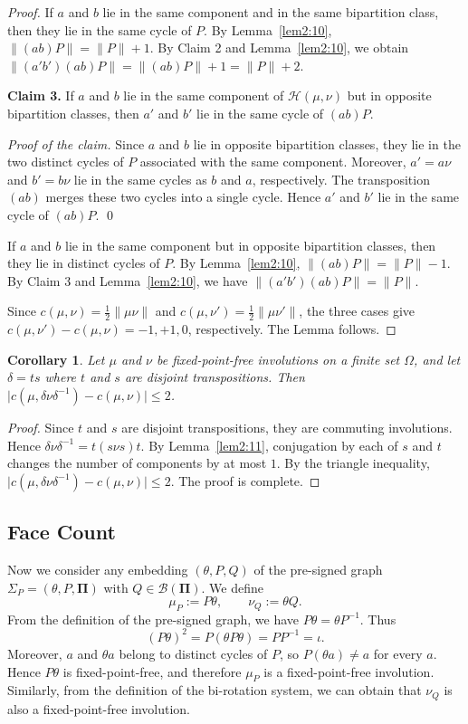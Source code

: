 \documentclass[10pt,a4paper]{amsart}
\newtheorem{corollary}[theorem]{Corollary}
\begin{document}
\begin{proof}
\medskip
If $a$ and $b$ lie in the same component and in the same bipartition class, then they lie in the same cycle of $P$. By Lemma~\ref{lem2:10},
$\lVert(ab)P\rVert=\lVert P\rVert+1$.
By Claim 2 and Lemma~\ref{lem2:10}, we obtain
$\lVert (a'b')(ab)P\rVert=\lVert(ab)P\rVert+1=\lVert P\rVert+2$.


\medskip
\noindent\textbf{Claim 3.}
If $a$ and $b$ lie in the same component of $\mathcal H(\mu,\nu)$ but in opposite bipartition classes, then $a'$ and $b'$ lie in the same cycle of $(ab)P$.

\smallskip
\noindent\emph{Proof of the claim.}
Since $a$ and $b$ lie in opposite bipartition classes, they lie in the two distinct cycles of $P$ associated with the same component. Moreover, $a'=a\nu$ and $b'=b\nu$ lie in the same cycles as
$b$ and $a$, respectively. The transposition $(ab)$ merges these two cycles into a single cycle. Hence $a'$ and $b'$ lie in the same cycle of $(ab)P$.  \qed

\medskip
If $a$ and $b$ lie in the same component but in opposite bipartition classes, then they lie in distinct cycles of $P$. By Lemma~\ref{lem2:10},
$\lVert(ab)P\rVert=\lVert P\rVert-1$.
By  Claim 3 and Lemma~\ref{lem2:10}, we have $\lVert (a'b')(ab)P\rVert=\lVert P\rVert$.


Since $c(\mu,\nu)=\frac12\lVert\mu\nu\rVert$ and
$c(\mu,\nu')=\frac12\lVert\mu\nu'\rVert$, the three cases give
$c(\mu,\nu')-c(\mu,\nu)=-1,+1,0$, respectively.  The Lemma follows.
\end{proof}


\begin{corollary}
\label{cor2:12}
Let $\mu$ and $\nu$ be fixed-point-free involutions on a finite set $\Omega$, and let $\delta=ts$ where $t$ and $s$ are disjoint transpositions. Then
$\bigl|c(\mu,\delta\nu\delta^{-1})-c(\mu,\nu)\bigr|\leq 2$.
\end{corollary}

\begin{proof}
Since $t$ and $s$ are disjoint transpositions, they are commuting involutions. Hence
$\delta\nu\delta^{-1}=t(s\nu s)t$.
By Lemma~\ref{lem2:11}, conjugation by each of $s$ and $t$ changes the number of components by at most $1$. By the triangle inequality,
$\bigl|c(\mu,\delta\nu\delta^{-1})-c(\mu,\nu)\bigr|\leq 2$. The proof is complete.
\end{proof}

\subsection{Face Count}
 Now we consider any embedding $(\theta,P,Q)$ of the pre-signed graph $\Sigma_P=(\theta,P,\mathbf{\Pi})$ with $Q\in\mathcal B(\mathbf{\Pi})$. We define
$$ \mu_P:=P\theta,
  \qquad
  \nu_Q:=\theta Q.$$
From the definition of the pre-signed graph, we have $P\theta=\theta P^{-1}$. Thus
\[
(P\theta)^2=P(\theta P\theta)=PP^{-1}=\iota.
\]Moreover, $a$ and $\theta a$ belong to distinct cycles of $P$,
so $P(\theta a)\neq a$ for every $a$. Hence $P\theta$ is
fixed-point-free, and therefore $\mu_P$ is a
fixed-point-free involution. Similarly, from the definition of the bi-rotation system, we can obtain that $\nu_Q$ is also a
fixed-point-free involution.
\end{document}
